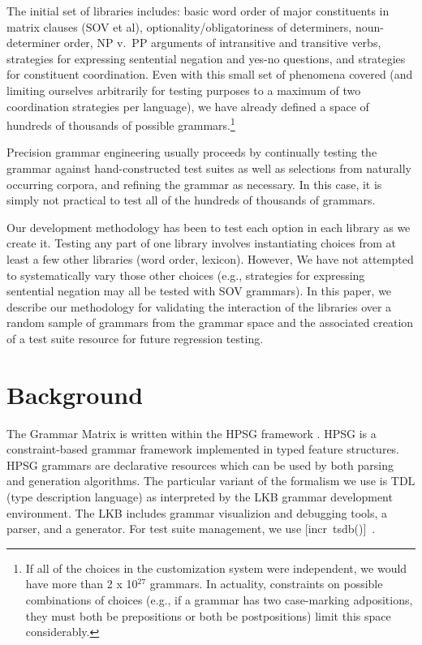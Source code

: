 \documentclass[11pt]{article}
\newcommand{\itsdb}{\mbox{[incr tsdb()]}}
\begin{document}
The initial set of libraries includes: basic word order of major
constituents in matrix clauses (SOV et al), optionality/obligatoriness
of determiners, noun-determiner order, NP v.\ PP arguments of intransitive
and transitive verbs, strategies for expressing sentential
negation and yes-no questions, and strategies for constituent coordination.
Even with this small set of phenomena covered (and limiting ourselves
arbitrarily for testing purposes to a maximum of two coordination strategies
per language), we have already defined a space of hundreds of thousands of possible
grammars.\footnote{If all of the choices in the customization system
were independent, we would have more than 2 x 10$^{27}$ grammars.  In actuality,
constraints on possible combinations of choices (e.g., if a grammar
has two case-marking adpositions, they must both be prepositions or
both be postpositions) limit this space considerably.}

Precision grammar engineering usually proceeds by continually
testing the grammar against hand-constructed test suites as well
as selections from naturally occurring corpora, and refining the
grammar as necessary.  In this case, it is simply not practical to
test all of the hundreds of thousands of grammars.  

Our development methodology has been to test each option in each
library as we create it.  Testing any part of one library involves
instantiating choices from at least a few other libraries (word order,
lexicon).  However, We have not attempted to systematically vary those other
choices (e.g., strategies for expressing
sentential negation may all be tested with SOV grammars).  In this
paper, we describe our methodology for validating the interaction
of the libraries over a random sample of grammars from the 
grammar space and the associated creation of a test suite resource for
future regression testing. 

\section{Background}

The Grammar Matrix is written within the HPSG framework
\cite{Pol:Sag:94,Sag:Was:Ben:03}.  HPSG is a constraint-based grammar
framework implemented in typed feature structures.  HPSG grammars are
declarative resources which can be used by both parsing and generation
algorithms.  The particular variant of the formalism we use is TDL
(type description language) as interpreted by the LKB
\cite{Copestake02} grammar development environment.  The LKB includes
grammar visualizion and debugging tools, a parser, and a generator. 
For test suite management, we use \itsdb\ \cite{Oepen:01}.
\end{document}
